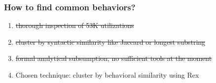 \begin{frame}
\frametitle{How to find common behaviors?}
\begin{enumerate}
\item \sout{thorough inspection of 53K utilizations}
\item \sout{cluster by syntactic similarity like Jaccard or longest substring}
\item \sout{formal analytical subsumption, no sufficient tools at the moment}
\item \begin{Large}Chosen technique: cluster by behavioral similarity using Rex \end{Large}
\end{enumerate}
\end{frame}



